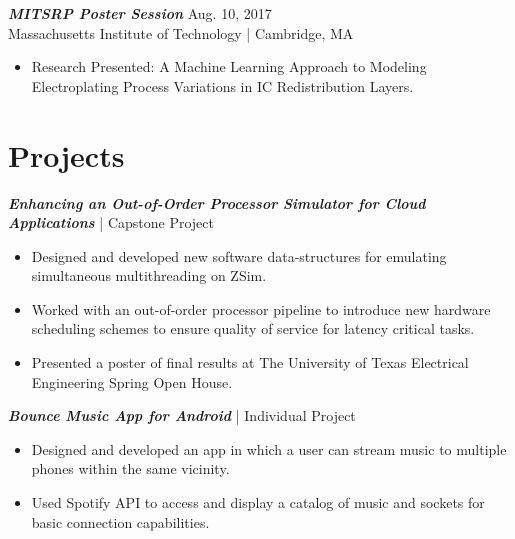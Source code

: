 \documentclass[letter]{res}
\begin{document}
\begin{resume}
{\sl \textbf{MITSRP Poster Session}} \hfill Aug. 10, 2017\\
Massachusetts Institute of Technology | Cambridge, MA\newline

 \vspace{-4mm}
 
\begin{itemize}
 \item Research Presented: A Machine Learning Approach to Modeling Electroplating Process Variations in IC Redistribution Layers.
 \end{itemize}

\vspace{-4mm}

\section{Projects}
{\sl \textbf{Enhancing an Out-of-Order Processor Simulator for Cloud Applications}} | Capstone Project\\

 \vspace{-4mm}
 
\begin{itemize}
 \item Designed and developed new software data-structures for emulating simultaneous multithreading on ZSim.
 \item Worked with an out-of-order processor pipeline to introduce new hardware scheduling schemes to ensure quality of service for latency critical tasks.
 \item Presented a poster of final results at The University of Texas Electrical Engineering Spring Open House.
\end{itemize}

\vspace{-2mm}

{\sl \textbf{Bounce Music App for Android}} | Individual Project\\

 \vspace{-4mm}
 
\begin{itemize}
 \item Designed and developed an app in which a user can stream music to multiple phones within the same vicinity.
 \item Used Spotify API to access and display a catalog of music and sockets for basic connection capabilities.
\end{itemize}


\end{resume}
\end{document}
